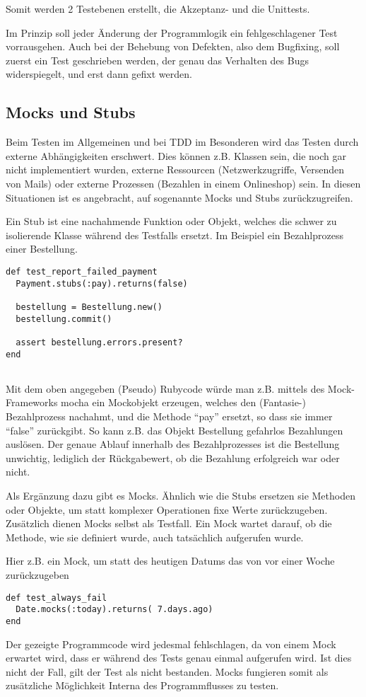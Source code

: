   Somit werden 2 Testebenen erstellt, die Akzeptanz- und die Unittests.

  Im Prinzip soll jeder Änderung der Programmlogik ein fehlgeschlagener Test vorrausgehen. Auch bei der Behebung von Defekten, also dem Bugfixing, soll zuerst ein Test geschrieben werden, der genau das Verhalten des Bugs widerspiegelt, und erst dann gefixt werden.
  
    
  \subsection{Mocks und Stubs}
  Beim Testen im Allgemeinen und bei TDD im Besonderen wird das Testen durch externe Abhängigkeiten erschwert. Dies können z.B. Klassen sein, die noch gar nicht implementiert wurden, externe Ressourcen (Netzwerkzugriffe, Versenden von Mails) oder externe Prozessen (Bezahlen in einem Onlineshop) sein. In diesen Situationen ist es angebracht, auf sogenannte Mocks und Stubs zurückzugreifen.
  
  Ein Stub ist eine nachahmende Funktion oder Objekt, welches die schwer zu isolierende Klasse während des Testfalls ersetzt. Im Beispiel ein Bezahlprozess einer Bestellung.
  \begin{lstlisting}
def test_report_failed_payment
  Payment.stubs(:pay).returns(false)
  
  bestellung = Bestellung.new()
  bestellung.commit()
  
  assert bestellung.errors.present?
end


  \end{lstlisting}
  Mit dem oben angegeben (Pseudo) Rubycode würde man z.B. mittels des Mock-Frameworks mocha ein Mockobjekt erzeugen, welches den (Fantasie-) Bezahlprozess nachahmt, und die Methode "`pay"' ersetzt, so dass sie immer "`false"' zurückgibt.
  So kann z.B. das Objekt Bestellung gefahrlos Bezahlungen auslösen. Der genaue Ablauf innerhalb des Bezahlprozesses ist die Bestellung unwichtig, lediglich der Rückgabewert, ob die Bezahlung erfolgreich war oder nicht.
  
  Als Ergänzung dazu gibt es Mocks. Ähnlich wie die Stubs ersetzen sie Methoden oder Objekte, um statt komplexer Operationen fixe Werte zurückzugeben. Zusätzlich dienen Mocks selbst als Testfall. Ein Mock wartet darauf, ob die Methode, wie sie definiert wurde, auch tatsächlich aufgerufen wurde.
  
  Hier z.B. ein Mock, um statt des heutigen Datums das von vor einer Woche zurückzugeben
  \begin{lstlisting}
def test_always_fail
  Date.mocks(:today).returns( 7.days.ago)
end
  \end{lstlisting}
  Der gezeigte Programmcode wird jedesmal fehlschlagen, da von einem Mock erwartet wird, dass er während des Tests genau einmal aufgerufen wird. Ist dies nicht der Fall, gilt der Test als nicht bestanden. Mocks fungieren somit als zusätzliche Möglichkeit Interna des Programmflusses zu testen.

